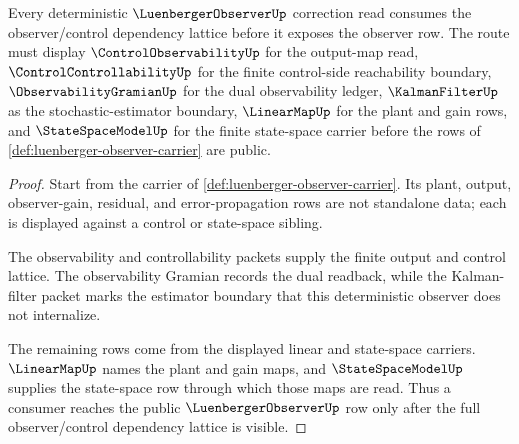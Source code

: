 \begin{theorem}
\label{thm:luenberger-observer-control-lattice-route}
Every deterministic $\LuenbergerObserverUp$ correction read consumes the observer/control dependency lattice before it exposes the observer row. The route must display $\ControlObservabilityUp$ for the output-map read, $\ControlControllabilityUp$ for the finite control-side reachability boundary, $\ObservabilityGramianUp$ for the dual observability ledger, $\KalmanFilterUp$ as the stochastic-estimator boundary, $\LinearMapUp$ for the plant and gain rows, and $\StateSpaceModelUp$ for the finite state-space carrier before the rows of \autoref{def:luenberger-observer-carrier} are public.
\end{theorem}
\begin{proof}
Start from the carrier of \autoref{def:luenberger-observer-carrier}. Its plant, output, observer-gain, residual, and error-propagation rows are not standalone data; each is displayed against a control or state-space sibling.

The observability and controllability packets supply the finite output and control lattice. The observability Gramian records the dual readback, while the Kalman-filter packet marks the estimator boundary that this deterministic observer does not internalize.

The remaining rows come from the displayed linear and state-space carriers. $\LinearMapUp$ names the plant and gain maps, and $\StateSpaceModelUp$ supplies the state-space row through which those maps are read. Thus a consumer reaches the public $\LuenbergerObserverUp$ row only after the full observer/control dependency lattice is visible.
\end{proof}
